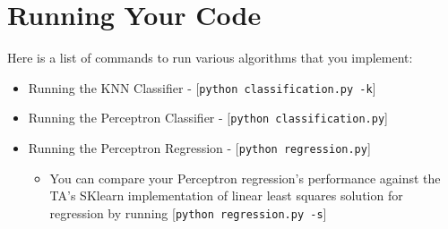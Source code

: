 \documentclass{article}
\begin{document}
\section{Running Your Code}

Here is a list of commands to run various algorithms that you implement:

\begin{itemize}
\item Running the KNN Classifier - [\verb|python classification.py -k|]
\item Running the Perceptron Classifier - [\verb|python classification.py|]
\item Running the Perceptron Regression - [\verb|python regression.py|]
    \begin{itemize}
        \item You can compare your Perceptron regression's performance against the TA's SKlearn implementation of linear least squares solution for regression by running [\verb|python regression.py -s|]
    \end{itemize}
\end{itemize}





\end{document}
